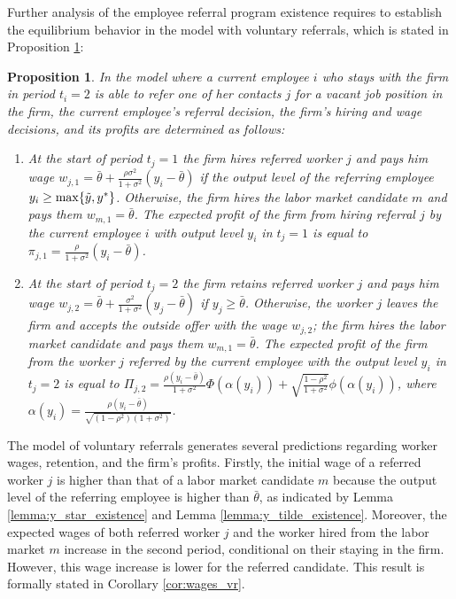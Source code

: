 \documentclass[12pt]{article}
\newtheorem{proposition}{Proposition}
\begin{document}
Further analysis of the employee referral program existence requires to establish the equilibrium behavior in the model with voluntary referrals, which is stated in Proposition \ref{prop:eq_vr}:
\begin{proposition}\label{prop:eq_vr}
    In the model where a current employee $i$ who stays with the firm in period $t_i = 2$ is able to refer one of her contacts $j$ for a vacant job position in the firm, the current employee's referral decision, the firm’s hiring and wage decisions, and its profits are determined as follows:
    \begin{enumerate}[label={\roman*})]
		\item At the start of period $t_j = 1$ the firm hires referred worker $j$ and pays him wage $w_{j,1} = \bar{\theta}+\frac{\rho \sigma^2}{1+\sigma^2} \left(y_i - \bar{\theta}\right)$ if the output level of the referring employee $y_i \geq \max \{ \Tilde{y}, y^* \}$. Otherwise, the firm hires the labor market candidate $m$ and pays them $w_{m,1} = \bar{\theta}$. The expected profit of the firm from hiring referral $j$ by the current employee $i$ with output level $y_i$ in $t_j = 1$ is equal to $\pi_{j,1} = \frac{\rho}{1+\sigma^2}\left(y_i - \bar{\theta}\right)$.
        \item At the start of period $t_j = 2$ the firm retains referred worker $j$ and pays him wage $w_{j,2} = \bar{\theta} + \frac{\sigma^2}{1+\sigma^2}\left( y_j - \bar{\theta} \right)$ if $y_j \geq \bar{\theta}$. Otherwise, the worker $j$ leaves the firm and accepts the outside offer with the wage $w_{j,2}$; the firm hires the labor market candidate and pays them $w_{m,1} = \bar{\theta}$. The expected profit of the firm from the worker $j$ referred by the current employee with the output level $y_i$ in $t_j = 2$ is equal to $\Pi_{j,2} = \frac{\rho\left(y_i-\bar{\theta}\right)}{1 + \sigma^2}\Phi(\alpha(y_i))
        +\sqrt{\frac{1-\rho^2}{1+\sigma^2}}\phi(\alpha(y_i))$, where $\alpha (y_i) = \frac{\rho\left(y_i - \bar{\theta}\right)}{\sqrt{(1-\rho^2)(1+\sigma^2)}}$.
	\end{enumerate}
\end{proposition}

The model of voluntary referrals generates several predictions regarding worker wages, retention, and the firm's profits. Firstly, the initial wage of a referred worker $j$ is higher than that of a labor market candidate $m$ because the output level of the referring employee is higher than $\bar{\theta}$, as indicated by Lemma \ref{lemma:y_star_existence} and Lemma \ref{lemma:y_tilde_existence}. Moreover, the expected wages of both referred worker $j$ and the worker hired from the labor market $m$ increase in the second period, conditional on their staying in the firm. However, this wage increase is lower for the referred candidate. This result is formally stated in Corollary \ref{cor:wages_vr}.
\end{document}
